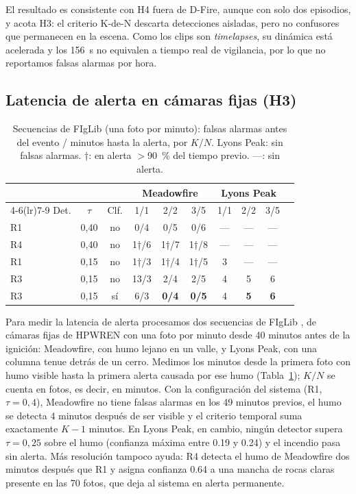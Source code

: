 \documentclass[conference,a4paper]{IEEEtran}
\begin{document}
El resultado es consistente con H4 fuera de D-Fire, aunque con solo dos episodios, y acota H3: el criterio K-de-N descarta detecciones aisladas, pero no confusores que permanecen en la escena. Como los clips son \textit{timelapses}, su dinámica está acelerada y los \SI{156}{s} no equivalen a tiempo real de vigilancia, por lo que no reportamos falsas alarmas por hora.

\subsection{Latencia de alerta en cámaras fijas (H3)}
\label{sec:figlib}

\begin{table}[t]
\centering
\caption{Secuencias de FIgLib (una foto por minuto): falsas alarmas antes del evento / minutos hasta la alerta, por $K/N$. Lyons Peak: sin falsas alarmas. †: en alerta $>$\SI{90}{\percent} del tiempo previo. —: sin alerta.}
\label{tab:figlib}
\setlength{\tabcolsep}{3pt}
\begin{tabular}{@{}lccccccccc@{}}
\toprule
 & & & \multicolumn{3}{c}{Meadowfire} & \multicolumn{3}{c}{Lyons Peak} \\
\cmidrule(lr){4-6}\cmidrule(lr){7-9}
Det. & $\tau$ & Clf. & 1/1 & 2/2 & 3/5 & 1/1 & 2/2 & 3/5 \\
\midrule
R1 & 0,40 & no & 0/4 & 0/5 & 0/6 & — & — & — \\
R4 & 0,40 & no & 1†/6 & 1†/7 & 1†/8 & — & — & — \\
R1 & 0,15 & no & 1†/3 & 1†/4 & 1†/5 & 3 & — & — \\
R3 & 0,15 & no & 13/3 & 2/4 & 2/5 & 4 & 5 & 6 \\
R3 & 0,15 & sí & 6/3 & \textbf{0/4} & \textbf{0/5} & 4 & \textbf{5} & \textbf{6} \\
\bottomrule
\end{tabular}
\end{table}

Para medir la latencia de alerta procesamos dos secuencias de FIgLib \cite{dewangan2022figlib}, de cámaras fijas de HPWREN con una foto por minuto desde 40 minutos antes de la ignición: Meadowfire, con humo lejano en un valle, y Lyons Peak, con una columna tenue detrás de un cerro. Medimos los minutos desde la primera foto con humo visible hasta la primera alerta causada por ese humo (Tabla~\ref{tab:figlib}); $K/N$ se cuenta en fotos, es decir, en minutos. Con la configuración del sistema (R1, $\tau=0{,}4$), Meadowfire no tiene falsas alarmas en los 49 minutos previos, el humo se detecta 4 minutos después de ser visible y el criterio temporal suma exactamente $K-1$ minutos. En Lyons Peak, en cambio, ningún detector supera $\tau=0{,}25$ sobre el humo (confianza máxima entre \num{0.19} y \num{0.24}) y el incendio pasa sin alerta. Más resolución tampoco ayuda: R4 detecta el humo de Meadowfire dos minutos después que R1 y asigna confianza \num{0.64} a una mancha de rocas claras presente en las 70 fotos, que deja al sistema en alerta permanente.
\end{document}
